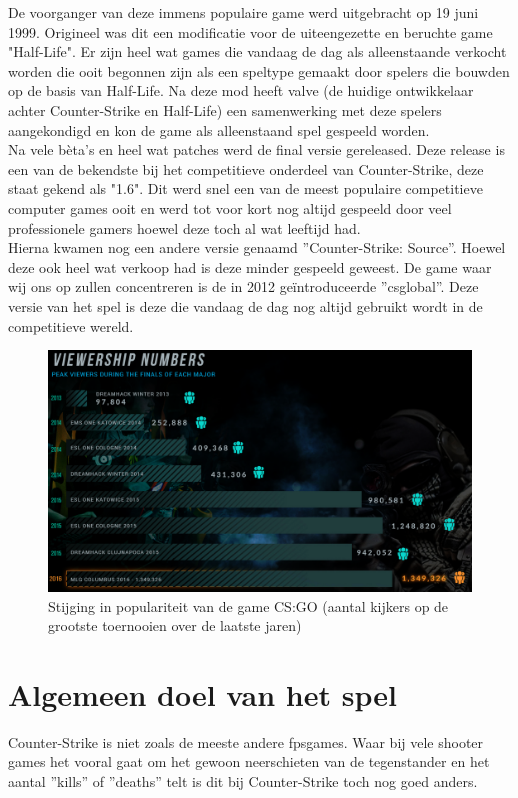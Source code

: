 \documentclass[pdftex,a4paper,12pt,twoside]{report}
\begin{document}
De voorganger van deze immens populaire game werd uitgebracht op 19 juni 1999. Origineel was dit een modificatie voor de uiteengezette en beruchte game "Half-Life". Er zijn heel wat games die vandaag de dag als alleenstaande verkocht worden die ooit begonnen zijn als een speltype gemaakt door spelers die bouwden op de basis van Half-Life. Na deze mod heeft \gls{valve} (de huidige ontwikkelaar achter Counter-Strike en Half-Life) een samenwerking met deze spelers aangekondigd en kon de game als alleenstaand spel gespeeld worden.
\\

Na vele bèta's en heel wat patches werd de final versie gereleased. Deze release is een van de bekendste bij het competitieve onderdeel van Counter-Strike, deze staat gekend als "1.6". Dit werd snel een van de meest populaire competitieve computer games ooit en werd tot voor kort nog altijd gespeeld door veel professionele gamers hoewel deze toch al wat leeftijd had.
\citep{dusttodust}
\\

Hierna kwamen nog een andere versie genaamd ''Counter-Strike: Source''. Hoewel deze ook heel wat verkoop had is deze minder gespeeld geweest. De game waar wij ons op zullen concentreren is de in 2012 geïntroduceerde ''\gls{csglobal}''. Deze versie van het spel is deze die vandaag de dag nog altijd gebruikt wordt in de competitieve wereld.

\begin{figure}[H]
\centering
\includegraphics[width=15cm]{img/dathostInfographic}
\caption{Stijging in populariteit van de game CS:GO (aantal kijkers op de grootste toernooien over de laatste jaren)}
\end{figure}

\section{Algemeen doel van het spel}
\label{sec:algemeen doel van het spel}
Counter-Strike is niet zoals de meeste andere \gls{fpsgames}. Waar bij vele shooter games het vooral gaat om het gewoon neerschieten van de tegenstander en het aantal ''kills'' of ''deaths'' telt is dit bij Counter-Strike toch nog goed anders.
\\
\end{document}
